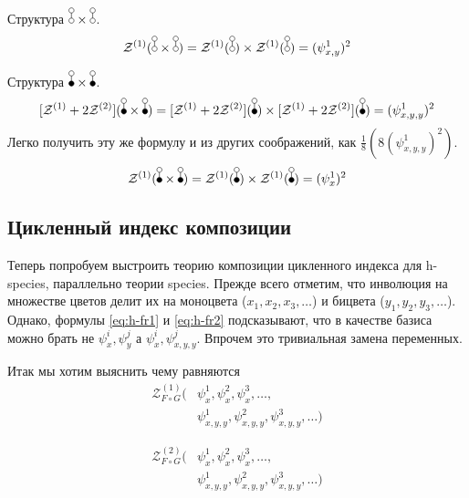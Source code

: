 Структура $\dA \times \dA$.
$$
\mathcal Z^{(1)}(\dA \times \dA) = \mathcal Z^{(1)}(\dA) \times \mathcal
Z^{(1)}(\dA) = (\psi_{x, y}^1)^2
$$

Структура $\dB \times \dB$.
$$
\Zfull(\dB \times \dB) = \Zfull(\dB) \times \Zfull(\dB) =(\psi_{x, y, y}^1)^2
$$
Легко получить эту же формулу и из других соображений, как
$\frac{1}{8}(8(\psi_{x, y, y}^1)^2)$.
$$
\mathcal Z^{(1)}(\dB \times \dB) = \mathcal Z^{(1)}(\dB) \times \mathcal
Z^{(1)}(\dB) =(\psi_{x}^1)^2
$$

\subsection{Цикленный индекс композиции}
Теперь попробуем выстроить теорию композиции цикленного индекса для h-species,
параллельно теории species. Прежде всего отметим, что инволюция на множестве
цветов делит их на моноцвета ($x_1, x_2, x_3, \dots$) и бицвета ($y_1, y_2,
y_3, \dots$). Однако, формулы \ref{eq:h-fr1} и \ref{eq:h-fr2} подсказывают, что
в качестве базиса можно брать не $\psi_x^i, \psi_y^j$ а $\psi_x^i, \psi_{x,y,y}^j$. Впрочем это
тривиальная замена переменных.

Итак мы хотим выяснить чему равняются
\begin{equation*}
\begin{split}
\mathcal Z^{(1)}_{F \circ G} (&\psi_x^1, \psi_x^2, \psi_x^3, \dots, \\
						&\psi_{x,y,y}^1, \psi_{x,y,y}^2, \psi_{x,y,y}^3, \dots)
\end{split}
\end{equation*}

\begin{equation*}
\begin{split}
\mathcal Z^{(2)}_{F \circ G} (&\psi_x^1, \psi_x^2, \psi_x^3, \dots, \\
						&\psi_{x,y,y}^1, \psi_{x,y,y}^2, \psi_{x,y,y}^3, \dots)
\end{split}
\end{equation*}

